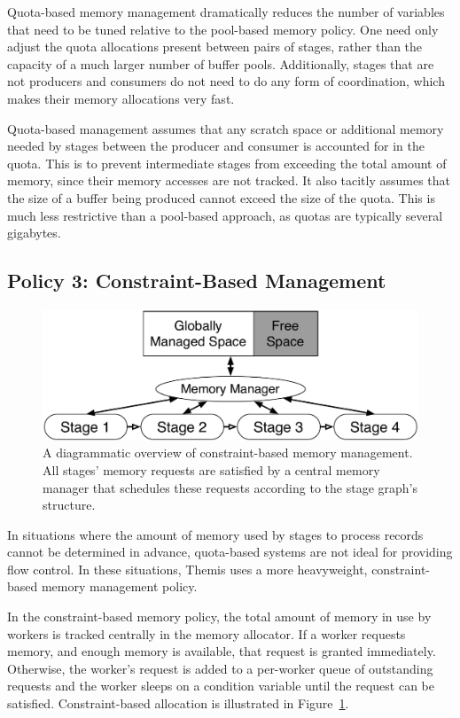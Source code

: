 Quota-based memory management dramatically reduces the number of variables that
need to be tuned relative to the pool-based memory policy.  One need only
adjust the quota allocations present between pairs of stages, rather than the
capacity of a much larger number of buffer pools.  Additionally, stages that
are not producers and consumers do not need to do any form of coordination,
which makes their memory allocations very fast.

Quota-based management assumes that any scratch space or additional memory
needed by stages between the producer and consumer is accounted for in the
quota.  This is to prevent intermediate stages from exceeding the total amount
of memory, since their memory accesses are not tracked.  It also tacitly
assumes that the size of a buffer being produced cannot exceed the size of the
quota. This is much less restrictive than a pool-based approach, as quotas are
typically several gigabytes.

\subsection{Policy 3: Constraint-Based Management}

\begin{figure}
  \centering
  \includegraphics[width=\columnwidth]{themis/figures/constraint_based_manager.pdf}
  \caption{\label{fig:memory_allocators:constraint} A diagrammatic overview of
    constraint-based memory management. All stages' memory requests are
    satisfied by a central memory manager that schedules these requests
    according to the stage graph's structure.}
\end{figure}

In situations where the amount of memory used by stages to process records
cannot be determined in advance, quota-based systems are not ideal for
providing flow control. In these situations, Themis uses a more heavyweight,
constraint-based memory management policy.

In the constraint-based memory policy, the total amount of memory in use by
workers is tracked centrally in the memory allocator. If a worker requests
memory, and enough memory is available, that request is granted immediately.
Otherwise, the worker's request is added to a per-worker queue of outstanding
requests and the worker sleeps on a condition variable until the request can be
satisfied. Constraint-based allocation is illustrated in
Figure~\ref{fig:memory_allocators:constraint}.

